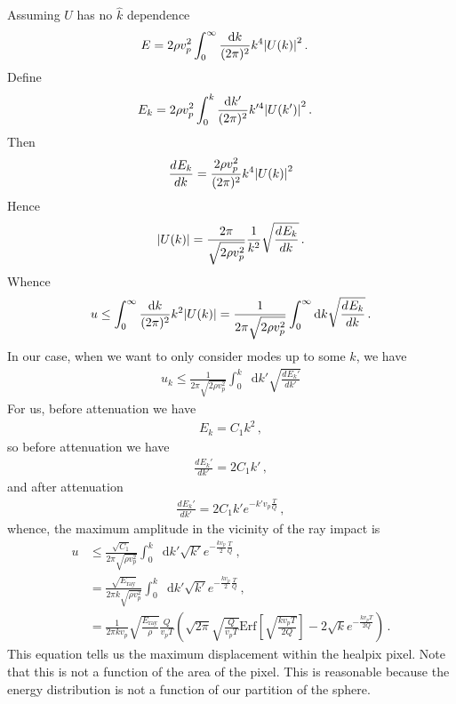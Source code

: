 \documentclass{article}
\newcommand*\diff{\mathop{}\!\mathrm{d}}
\newcommand*\te[1]{\text{#1}}
\newcommand*\p[1]{\left(#1\right)}
\newcommand*\ps[1]{\left[#1\right]}
\newcommand*\f[2]{\frac{#1}{#2}}
\newcommand*\td[3]{\frac{d^{#3}#1}{d #2^{#3}}}
\begin{document}
Assuming $U$ has no $\hat k$ dependence
\begin{align}
E&=2\rho v_p^2\int_{0}^{\infty}\f{\diff k}{(2\pi)^2}k^4\abs{U(k)}^2\,.
\end{align}
Define
\begin{align}
E_k &=2\rho v_p^2\int_{0}^{k}\f{\diff k'}{(2\pi)^2}k'^4\abs{U(k')}^2\,.
\end{align}
Then
\begin{align}
\td{E_k}{k}{} =\f{2\rho v_p^2}{(2\pi)^2}k^4\abs{U(k)}^2
\end{align}
Hence
\begin{align}
\abs{U(k)} = \f{2\pi}{\sqrt{2\rho v_p^2}}\f{1}{k^2}\sqrt{\td{E_k}{k}{}}\,.
\end{align}
Whence
\begin{align}
u \leq \int_0^\infty \f{\diff k}{(2\pi)^2} k^2\abs{U(k)} = \f{1}{2\pi\sqrt{2\rho v_p^2}}\int_0^\infty\diff k\sqrt{\td{E_k}{k}{}}\,.
\end{align}
In our case, when we want to only consider modes up to some $k$, we have
\begin{align}
u_k \leq \f{1}{2\pi\sqrt{2\rho v_p^2}}\int_0^k\diff k'\sqrt{\td{E_k'}{k'}{}}
\end{align}
For us, before attenuation we have
\begin{align}
E_k = C_1 k^2\,,
\end{align}
so before attenuation we have
\begin{align}
\td{E_k'}{k'}{} = 2 C_1 k'\,,
\end{align}
and after attenuation
\begin{align}
\td{E_k'}{k'}{} = 2 C_1 k'e^{-k' v_p\f{T}{Q}}\,,
\end{align}
whence, the maximum amplitude in the vicinity of the ray impact is
\begin{align}
u &\leq \f{\sqrt{C_1}}{2\pi\sqrt{\rho v_p^2}}\int_0^k\diff k' \sqrt{k'}e^{-\f{k v_p}{2}\f{T}{Q}}\,,\\
&=\f{\sqrt{E_{\te{ray}}}}{2\pi k\sqrt{\rho v_p^2}}\int_0^k\diff k' \sqrt{k'}e^{-\f{k v_p}{2}\f{T}{Q}}\,,\\
&=\f{1}{2\pi kv_p}\sqrt{\f{E_{\te{ray}}}{\rho}}\f{Q}{v_p T}\p{\sqrt{2\pi}\sqrt{ \f{Q}{v_p T}}\te{Erf}\ps{\sqrt{\f{k v_p T}{2 Q}}} -2\sqrt{k} e^{-\f{k v_p T}{2 Q}}}\,.
\end{align}
This equation tells us the maximum displacement within the healpix pixel. Note that this is not a function of the area of the pixel. This is reasonable because the energy distribution is not a function of our partition of the sphere.
\pagebreak
\end{document}
